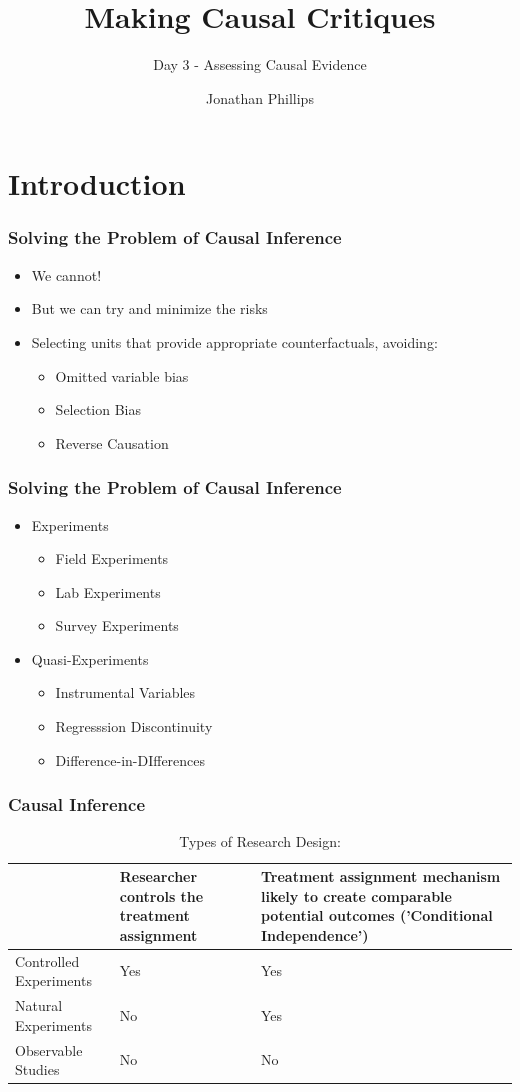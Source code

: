 \documentclass[xcolor=x11names,compress]{beamer}\usepackage[]{graphicx}\usepackage[]{color}
\title{Making Causal Critiques}
\subtitle{Day 3 - Assessing Causal Evidence}
\author{Jonathan Phillips}
\renewcommand{\(}{\begin{columns}}
\renewcommand{\)}{\end{columns}}
\newcommand{\<}[1]{\begin{column}{#1}}
\renewcommand{\>}{\end{column}}
\begin{document}
\frame{\titlepage}

\section{Introduction}

\begin{frame}
\frametitle{Solving the Problem of Causal Inference}
\begin{itemize}
\item We cannot!
\item But we can try and minimize the risks
\item Selecting units that provide appropriate counterfactuals, avoiding:
\begin{itemize}
\item Omitted variable bias
\item Selection Bias
\item Reverse Causation
\end{itemize}
\end{itemize}
\end{frame}

\begin{frame}
\frametitle{Solving the Problem of Causal Inference}
\begin{itemize}
\item Experiments
\begin{itemize}
\item Field Experiments
\item Lab Experiments
\item Survey Experiments
\end{itemize}
\item Quasi-Experiments
\begin{itemize}
\item Instrumental Variables
\item Regresssion Discontinuity
\item Difference-in-DIfferences
\end{itemize}
\end{itemize}
\end{frame}

\begin{frame}
\frametitle{Causal Inference}
\begin{table}[htbp]
  \centering
  \caption{Types of Research Design:}
    \begin{tabular}{|p{3.5cm}|p{3.5cm}|p{3.5cm}|}
    \toprule
          & Researcher controls the treatment assignment & Treatment assignment mechanism likely to create comparable potential outcomes ('Conditional Independence') \\
    \midrule
    Controlled Experiments & Yes   & Yes \\
    \midrule
    Natural Experiments & No    & Yes \\
    \midrule
    Observable Studies & No    & No \\
    \bottomrule
    \end{tabular}%
  \label{tab:addlabel}%
\end{table}%
\end{frame}
\end{document}
